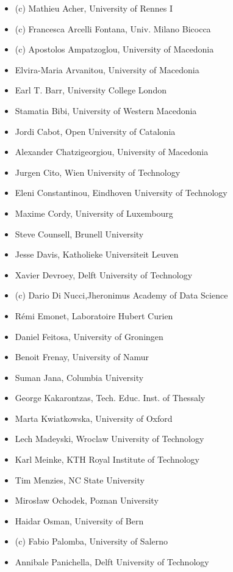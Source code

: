 \begin{itemize}[itemsep=0.5em]
	\item (c) Mathieu Acher, University of Rennes I 
	\item (c) Francesca Arcelli Fontana, Univ. Milano Bicocca 
	\item (c) Apostolos Ampatzoglou, University of Macedonia 
	\item Elvira-Maria Arvanitou, University of Macedonia 
	\item Earl T. Barr, University College London 
	\item Stamatia Bibi, University of Western Macedonia 
	\item Jordi Cabot, Open University of Catalonia 
	\item Alexander Chatzigeorgiou, University of Macedonia 
	\item Jurgen Cito, Wien University of Technology 
	\item Eleni Constantinou, Eindhoven University of Technology 
	\item Maxime Cordy, University of Luxembourg 
	\item Steve Counsell, Brunell University 
	\item Jesse Davis, Katholieke Universiteit Leuven 
	\item Xavier Devroey, Delft University of Technology 
	\item (c) Dario Di Nucci,Jheronimus Academy of Data Science 
	\item Rémi Emonet, Laboratoire Hubert Curien 
	\item Daniel Feitosa, University of Groningen 
	\item Benoit Frenay, University of Namur 
	\item Suman Jana, Columbia University
	\item George Kakarontzas, Tech. Educ. Inst. of Thessaly
	\item Marta Kwiatkowska, University of Oxford
	\item Lech Madeyski, Wroclaw University of Technology
	\item Karl Meinke, KTH Royal Institute of Technology
	\item Tim Menzies, NC State University
	\item Mirosław Ochodek, Poznan University
	\item Haidar Osman, University of Bern
	\item (c) Fabio Palomba, University of Salerno
	\item Annibale Panichella, Delft University of Technology

\end{itemize}
